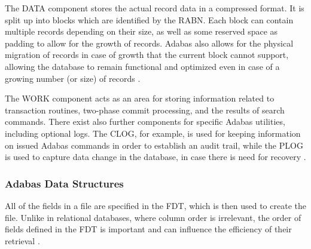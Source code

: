 The DATA component stores the actual record data in a compressed format. It is split up into blocks which are identified by the \ac{RABN}. Each block can contain multiple records depending on their size, as well as some reserved space as padding to allow for the growth of records. Adabas also allows for the physical migration of records in case of growth that the current block cannot support, allowing the database to remain functional and optimized even in case of a growing number (or size) of records \cite{adabasconcepts}.

The WORK component acts as an area for storing information related to transaction routines, two-phase commit processing, and the results of search commands. There exist also further components for specific Adabas utilities, including optional logs. The \ac{CLOG}, for example, is used for keeping information on issued Adabas commands in order to establish an audit trail, while the \ac{PLOG} is used to capture data change in the database, in case there is need for recovery \cite{adabasconcepts}.

\subsubsection{Adabas Data Structures}
\label{ch02:fundamentals:adabas:forzos:datastructures}
All of the fields in a file are specified in the \ac{FDT}, which is then used to create the file. Unlike in relational databases, where column order is irrelevant, the order of fields defined in the \ac{FDT} is important and can influence the efficiency of their retrieval \cite{storr1994effizienter}.

